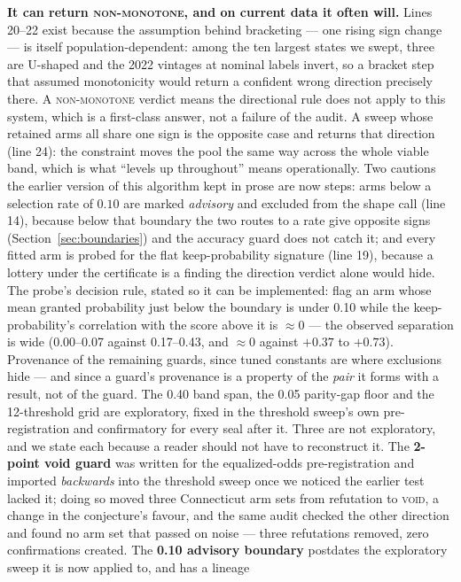 \documentclass[conference]{IEEEtran}
\begin{document}
\textbf{It can return \textsc{non-monotone}, and on current data it often will.} Lines
20--22 exist because the assumption behind bracketing --- one rising sign change --- is
itself population-dependent: among the ten largest states we swept, three are U-shaped
and the 2022 vintages at nominal labels invert, so a bracket step that assumed
monotonicity would return a confident wrong direction precisely there. A
\textsc{non-monotone} verdict means the directional rule does not apply to this system,
which is a first-class answer, not a failure of the audit. A sweep whose retained arms
all share one sign is the opposite case and returns that direction (line 24): the
constraint moves the pool the same way across the whole viable band, which is what
``levels up throughout'' means operationally. Two cautions the earlier version of this
algorithm kept in prose are now steps: arms below a selection rate of $0.10$ are marked
\emph{advisory} and excluded from the shape call (line 14), because below that boundary
the two routes to a rate give opposite signs (Section~\ref{sec:boundaries}) and the
accuracy guard does not catch it; and every fitted arm is probed for the flat
keep-probability signature (line 19), because a lottery under the certificate is a
finding the direction verdict alone would hide. The probe's decision rule, stated so it
can be implemented: flag an arm whose mean granted probability just below the boundary
is under 0.10 while the keep-probability's correlation with the score above it is
$\approx 0$ --- the observed separation is wide (0.00--0.07 against 0.17--0.43, and
$\approx 0$ against $+0.37$ to $+0.73$). Provenance of the remaining guards, since tuned
constants are where exclusions hide --- and since a guard's provenance is a property of
the \emph{pair} it forms with a result, not of the guard. The 0.40 band span, the 0.05
parity-gap floor and the 12-threshold grid are exploratory, fixed in the threshold sweep's
own pre-registration and confirmatory for every seal after it. Three are not exploratory,
and we state each because a reader should not have to reconstruct it. The \textbf{2-point
void guard} was written for the equalized-odds pre-registration and imported
\emph{backwards} into the threshold sweep once we noticed the earlier test lacked it; doing
so moved three Connecticut arm sets from refutation to \textsc{void}, a change in the
conjecture's favour, and the same audit checked the other direction and found no arm set
that passed on noise --- three refutations removed, zero confirmations created. The \textbf{0.10
advisory boundary} postdates the exploratory sweep it is now applied to, and has a lineage
\end{document}
